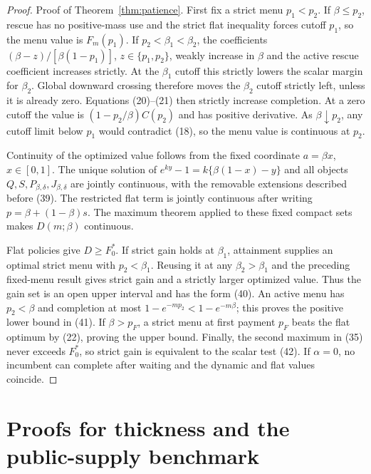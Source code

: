 \documentclass[mnsc,blindrev]{informs3}
\begin{document}
\begin{proof}{Proof of Theorem~\ref{thm:patience}.}
First fix a strict menu $p_1<p_2$.  If $\beta\le p_2$, rescue has no positive-mass
use and the strict flat inequality forces cutoff $p_1$, so the menu value is
$F_m(p_1)$.  If $p_2<\beta_1<\beta_2$, the coefficients
$(\beta-z)/[\beta(1-p_1)]$, $z\in\{p_1,p_2\}$, weakly increase in $\beta$ and the
active rescue coefficient increases strictly.  At the $\beta_1$ cutoff this
strictly lowers the scalar margin for $\beta_2$.  Global downward crossing
therefore moves the $\beta_2$ cutoff strictly left, unless it is already zero.
Equations (20)--(21) then strictly increase completion.  At a zero cutoff the
value is $(1-p_2/\beta)C(p_2)$ and has positive derivative.  As
$\beta\downarrow p_2$, any cutoff limit below $p_1$ would contradict (18), so
the menu value is continuous at $p_2$.

Continuity of the optimized value follows from the fixed coordinate
$a=\beta x$, $x\in[0,1]$.  The unique solution of
$e^{ky}-1=k\{\beta(1-x)-y\}$ and all objects
$Q,S,P_{\beta,\delta},J_{\beta,\delta}$ are jointly
continuous, with the removable extensions described before (39).  The
restricted flat term is jointly continuous after writing
$p=\beta+(1-\beta)s$.  The maximum theorem applied to these fixed compact
sets makes $D(m;\beta)$ continuous.

Flat policies give $D\ge F_0^*$.  If strict gain holds at $\beta_1$,
attainment supplies an optimal strict menu with $p_2<\beta_1$.  Reusing it at
any $\beta_2>\beta_1$ and the preceding fixed-menu result gives strict gain
and a strictly larger optimized value.  Thus the gain set is an open upper
interval and has the form (40).  An active menu has $p_2<\beta$ and completion
at most $1-e^{-mp_2}<1-e^{-m\beta}$; this proves the positive lower bound in
(41).  If $\beta>p_F$, a strict menu at first payment $p_F$ beats the flat
optimum by (22), proving the upper bound.  Finally, the second maximum in
(35) never exceeds $F_0^*$, so strict gain is equivalent to the scalar test
(42).  If $\alpha=0$, no incumbent can complete after waiting and the
dynamic and flat values coincide.
\Halmos\end{proof}

\section{Proofs for thickness and the public-supply benchmark}
\label{app:thickness}
\end{document}
